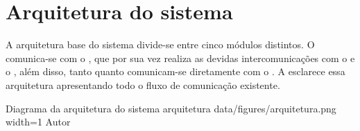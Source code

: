 \section{Arquitetura do sistema}
\label{sec:arquitetura}

A arquitetura base do sistema divide-se entre cinco módulos distintos. O  comunica-se com o , que por sua vez realiza as devidas intercomunicações com o  e o , além disso, tanto  quanto  comunicam-se diretamente com o . A  esclarece essa arquitetura apresentando todo o fluxo de comunicação existente.

\image
    {Diagrama da arquitetura do sistema}
    {arquitetura}
    {data/figures/arquitetura.png}
    {width=1\textwidth}
    {Autor}